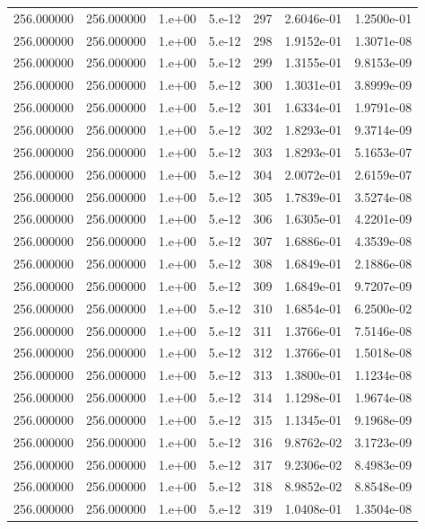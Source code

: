\begin{table}[htbp]
\begin{tabular}{rrrrrrr}
256.000000 & 256.000000 & 1.e+00 & 5.e-12 & 297 & 2.6046e-01 & 1.2500e-01 \\
256.000000 & 256.000000 & 1.e+00 & 5.e-12 & 298 & 1.9152e-01 & 1.3071e-08 \\
256.000000 & 256.000000 & 1.e+00 & 5.e-12 & 299 & 1.3155e-01 & 9.8153e-09 \\
256.000000 & 256.000000 & 1.e+00 & 5.e-12 & 300 & 1.3031e-01 & 3.8999e-09 \\
256.000000 & 256.000000 & 1.e+00 & 5.e-12 & 301 & 1.6334e-01 & 1.9791e-08 \\
256.000000 & 256.000000 & 1.e+00 & 5.e-12 & 302 & 1.8293e-01 & 9.3714e-09 \\
256.000000 & 256.000000 & 1.e+00 & 5.e-12 & 303 & 1.8293e-01 & 5.1653e-07 \\
256.000000 & 256.000000 & 1.e+00 & 5.e-12 & 304 & 2.0072e-01 & 2.6159e-07 \\
256.000000 & 256.000000 & 1.e+00 & 5.e-12 & 305 & 1.7839e-01 & 3.5274e-08 \\
256.000000 & 256.000000 & 1.e+00 & 5.e-12 & 306 & 1.6305e-01 & 4.2201e-09 \\
256.000000 & 256.000000 & 1.e+00 & 5.e-12 & 307 & 1.6886e-01 & 4.3539e-08 \\
256.000000 & 256.000000 & 1.e+00 & 5.e-12 & 308 & 1.6849e-01 & 2.1886e-08 \\
256.000000 & 256.000000 & 1.e+00 & 5.e-12 & 309 & 1.6849e-01 & 9.7207e-09 \\
256.000000 & 256.000000 & 1.e+00 & 5.e-12 & 310 & 1.6854e-01 & 6.2500e-02 \\
256.000000 & 256.000000 & 1.e+00 & 5.e-12 & 311 & 1.3766e-01 & 7.5146e-08 \\
256.000000 & 256.000000 & 1.e+00 & 5.e-12 & 312 & 1.3766e-01 & 1.5018e-08 \\
256.000000 & 256.000000 & 1.e+00 & 5.e-12 & 313 & 1.3800e-01 & 1.1234e-08 \\
256.000000 & 256.000000 & 1.e+00 & 5.e-12 & 314 & 1.1298e-01 & 1.9674e-08 \\
256.000000 & 256.000000 & 1.e+00 & 5.e-12 & 315 & 1.1345e-01 & 9.1968e-09 \\
256.000000 & 256.000000 & 1.e+00 & 5.e-12 & 316 & 9.8762e-02 & 3.1723e-09 \\
256.000000 & 256.000000 & 1.e+00 & 5.e-12 & 317 & 9.2306e-02 & 8.4983e-09 \\
256.000000 & 256.000000 & 1.e+00 & 5.e-12 & 318 & 8.9852e-02 & 8.8548e-09 \\
256.000000 & 256.000000 & 1.e+00 & 5.e-12 & 319 & 1.0408e-01 & 1.3504e-08 \\

\end{tabular}
\end{table}
